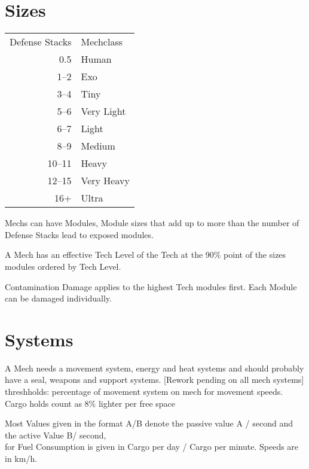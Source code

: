 \section{Sizes}\label{sec:sizes}
\begin{tabular}{r|l}
    Defense Stacks &Mechclass \\
    0.5 &Human\\
    1--2 &Exo\\
    3--4 &Tiny\\
    5--6 &Very Light\\
    6--7 &Light\\
    8--9 &Medium\\
    10--11 &Heavy\\
    12--15 &Very Heavy\\
    16+ &Ultra\\
\end{tabular}\newline
Mechs can have Modules, Module sizes that add up to more than the number of Defense Stacks lead to exposed modules.

A Mech has an effective Tech Level of the Tech at the 90\% point of the sizes modules ordered by Tech Level.\par
Contamination Damage applies to the highest Tech modules first.
Each Module can be damaged individually.\par
\section{Systems}\label{sec:systems}
A Mech needs a movement system, energy and heat systems and should probably have a seal, weapons and support systems.
[Rework pending on all mech systems]
\iffalse
threshholds: percentage of movement system on mech for movement speeds.
Cargo holds count as 8\% lighter per
free space\par
Most Values given in the format A/B denote the passive value A / second and the active Value B/ second, \\
for Fuel Consumption is given in Cargo per day / Cargo per minute.
Speeds are in km/h.
